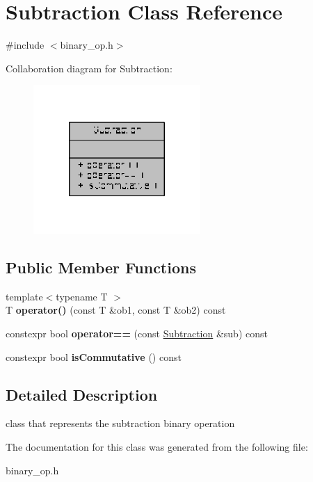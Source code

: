 \hypertarget{classSubtraction}{\section{Subtraction Class Reference}
\label{classSubtraction}
}


{\ttfamily \#include $<$binary\-\_\-op.\-h$>$}



Collaboration diagram for Subtraction\-:
\nopagebreak
\begin{figure}[H]
\begin{center}
\leavevmode
\includegraphics[width=180pt]{classSubtraction__coll__graph}
\end{center}
\end{figure}
\subsection*{Public Member Functions}
\begin{DoxyCompactItemize}
\item 
\hypertarget{classSubtraction_a6a5eda6df5da14d0d54e3414f655a10b}{{\footnotesize template$<$typename T $>$ }\\T {\bfseries operator()} (const T \&ob1, const T \&ob2) const }\label{classSubtraction_a6a5eda6df5da14d0d54e3414f655a10b}

\item 
\hypertarget{classSubtraction_a32d31b6ea4b2ceaee3380e5a68aa7121}{constexpr bool {\bfseries operator==} (const \hyperlink{classSubtraction}{Subtraction} \&sub) const }\label{classSubtraction_a32d31b6ea4b2ceaee3380e5a68aa7121}

\item 
\hypertarget{classSubtraction_ab530da04538ed82917ac04efae083601}{constexpr bool {\bfseries is\-Commutative} () const }\label{classSubtraction_ab530da04538ed82917ac04efae083601}

\end{DoxyCompactItemize}


\subsection{Detailed Description}
class that represents the subtraction binary operation 

The documentation for this class was generated from the following file\-:\begin{DoxyCompactItemize}
\item 
binary\-\_\-op.\-h\end{DoxyCompactItemize}
